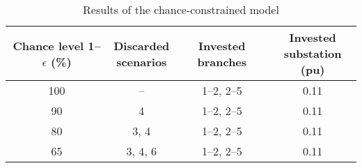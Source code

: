 \documentclass[journal]{IEEEtran}
\theoremstyle{remark}
\begin{document}
\begin{table}[htbp]
\renewcommand{\arraystretch}{1.1}
  \centering
  \caption{Results of the chance-constrained model}
  \label{table_III}
    \begin{tabular}{cccc}
    \toprule
     \pbox{20cm} {Chance level \\1--$\epsilon$ (\%)} &  \pbox{20cm} {Discarded \\ scenarios} & Invested  branches &  \pbox{20cm} {Invested \\substation (pu)} \\
    \midrule
    100   & --      & 1--2, 2--5 & 0.11 \\
    90    & 4      & 1--2, 2--5 & 0.11 \\
    80    & 3, 4   & 1--2, 2--5 & 0.11 \\
    65    & 3, 4, 6 & 1--2, 2--5 & 0.11 \\
    \bottomrule
    \end{tabular}%
  \label{tab:addlabel}%
\end{table}
%
\end{document}
